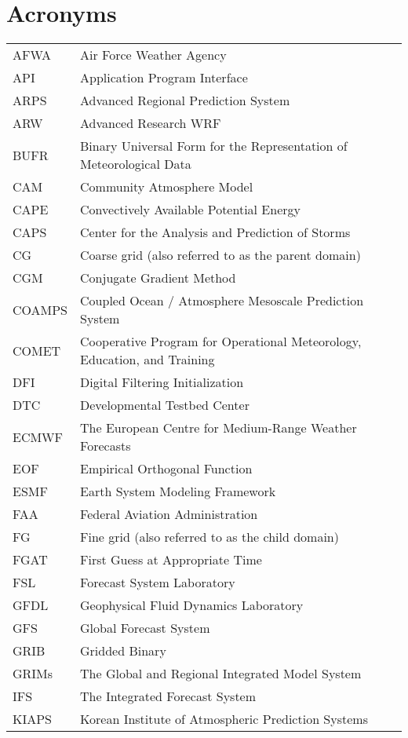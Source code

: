 \chapter{Acronyms}

\begin{tabular}[t]{ll}
AFWA & Air Force Weather Agency \\
API & Application Program Interface \\
ARPS & Advanced Regional Prediction System \\
ARW & Advanced Research WRF \\
BUFR & Binary Universal Form for the Representation of Meteorological Data \\
CAM & Community Atmosphere Model \\
CAPE & Convectively Available Potential Energy \\
CAPS & Center for the Analysis and Prediction of Storms \\
CG & Coarse grid (also referred to as the parent domain) \\
CGM & Conjugate Gradient Method \\
COAMPS & Coupled Ocean / Atmosphere Mesoscale Prediction System \\
COMET & Cooperative Program for Operational Meteorology, Education, and Training \\
DFI & Digital Filtering Initialization \\
DTC & Developmental Testbed Center \\
ECMWF & The European Centre for Medium-Range Weather Forecasts \\
EOF & Empirical Orthogonal Function \\
ESMF & Earth System Modeling Framework \\
FAA & Federal Aviation Administration \\
FG & Fine grid (also referred to as the child domain) \\
FGAT & First Guess at Appropriate Time \\
FSL & Forecast System Laboratory \\
GFDL & Geophysical Fluid Dynamics Laboratory \\
GFS & Global Forecast System \\
GRIB & Gridded Binary \\
GRIMs & The Global and Regional Integrated Model System \\
IFS & The Integrated Forecast System \\
KIAPS & Korean Institute of Atmospheric Prediction Systems \\

\end{tabular}
